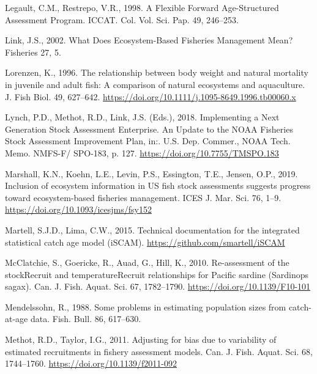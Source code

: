 \documentclass[]{article}
\begin{document}
\leavevmode\hypertarget{ref-legault1998Flexible}{}%
Legault, C.M., Restrepo, V.R., 1998. A Flexible Forward Age-Structured
Assessment Program. ICCAT. Col. Vol. Sci. Pap. 49, 246--253.

\leavevmode\hypertarget{ref-link2002What}{}%
Link, J.S., 2002. What Does Ecosystem-Based Fisheries Management Mean?
Fisheries 27, 5.

\leavevmode\hypertarget{ref-lorenzen1996Relationship}{}%
Lorenzen, K., 1996. The relationship between body weight and natural
mortality in juvenile and adult fish: A comparison of natural ecosystems
and aquaculture. J. Fish Biol. 49, 627--642.
\url{https://doi.org/10.1111/j.1095-8649.1996.tb00060.x}

\leavevmode\hypertarget{ref-lynch2018Implementing}{}%
Lynch, P.D., Methot, R.D., Link, J.S. (Eds.), 2018. Implementing a Next
Generation Stock Assessment Enterprise. An Update to the NOAA Fisheries
Stock Assessment Improvement Plan, in:. U.S. Dep. Commer., NOAA Tech.
Memo. NMFS-F/ SPO-183, p. 127. \url{https://doi.org/10.7755/TMSPO.183}

\leavevmode\hypertarget{ref-marshall2019Inclusion}{}%
Marshall, K.N., Koehn, L.E., Levin, P.S., Essington, T.E., Jensen, O.P.,
2019. Inclusion of ecosystem information in US fish stock assessments
suggests progress toward ecosystem-based fisheries management. ICES J.
Mar. Sci. 76, 1--9. \url{https://doi.org/10.1093/icesjms/fsy152}

\leavevmode\hypertarget{ref-martell2015Technical}{}%
Martell, S.J.D., Lima, C.W., 2015. Technical documentation for the
integrated statistical catch age model (iSCAM). \url{https://github.com/smartell/iSCAM}

\leavevmode\hypertarget{ref-mcclatchie2010Reassessment}{}%
McClatchie, S., Goericke, R., Auad, G., Hill, K., 2010. Re-assessment of
the stockRecruit and temperatureRecruit relationships for Pacific
sardine (Sardinops sagax). Can. J. Fish. Aquat. Sci. 67, 1782--1790.
\url{https://doi.org/10.1139/F10-101}

\leavevmode\hypertarget{ref-mendelssohn1988Problems}{}%
Mendelssohn, R., 1988. Some problems in estimating population sizes from
catch-at-age data. Fish. Bull. 86, 617--630.

\leavevmode\hypertarget{ref-methot2011Adjusting}{}%
Methot, R.D., Taylor, I.G., 2011. Adjusting for bias due to variability
of estimated recruitments in fishery assessment models. Can. J. Fish.
Aquat. Sci. 68, 1744--1760. \url{https://doi.org/10.1139/f2011-092}
\end{document}

